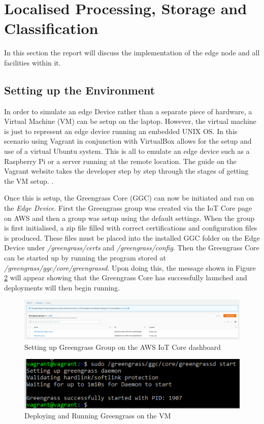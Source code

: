 \section{Localised Processing, Storage and Classification}
In this section the report will discuss the implementation of the edge node and all facilities within it.
\subsection{Setting up the Environment}
In order to simulate an edge Device rather than a separate piece of hardware, a Virtual Machine (VM) can be setup on the laptop. However, the virtual machine is just to represent an edge device running an embedded UNIX OS. In this scenario using Vagrant in conjunction with VirtualBox allows for the setup and use of a virtual Ubuntu system. This is all to emulate an edge device such as a Raspberry Pi or a server running at the remote location. The guide on the Vagrant website takes the developer step by step through the stages of getting the VM setup. \cite{installing_vagrant}. 

Once this is setup, the Greengrass Core (GGC) can now be initiated and ran on the \textit{Edge Device}. First the Greengrass group was created via the IoT Core page on AWS and then a group was setup using the default settings. When the group is first initialised, a zip file filled with correct certifications and configuration files is produced. These files must be placed into the installed GGC folder on the Edge Device under \textit{/greengrass/certs} and \textit{/greengrass/config}. Then the Greengrass Core can be started up by running the program stored at \textit{/greengrass/ggc/core/greengrassd}. Upon doing this, the message shown in Figure \ref{fig:running_greengrass_on_vm} will appear showing that the Greengrass Core has successfully launched and deployments will then begin running. 

\begin{figure}[ht]
    \centering
    \includegraphics[width=1\linewidth]{pages/Chapter4/Chapter 4 Images/greengrass_group.png}
    \caption{Setting up Greengrass Group on the AWS IoT Core dashboard}
    \label{fig:my_label}
\end{figure}
\begin{figure}[ht]
    \centering
    \includegraphics{pages/Chapter4/Chapter 4 Images/correctly_starting_greengrass.png}
    \caption{Deploying and Running Greengrass on the VM}
    \label{fig:running_greengrass_on_vm}
\end{figure}

